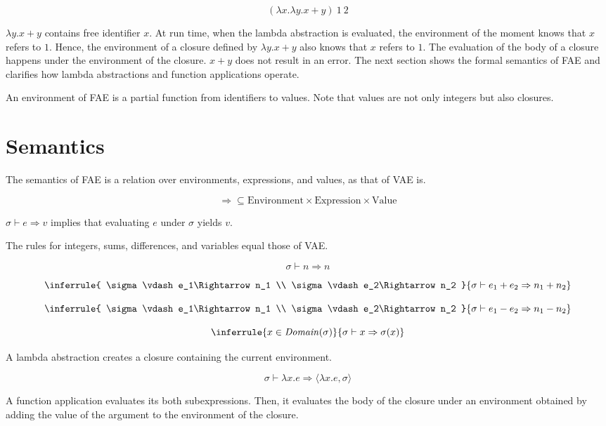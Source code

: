 \[(\lambda x.\lambda y.x + y)\ 1\ 2\]

\(\lambda y.x+y\) contains free identifier \(x\). At run time, when the lambda
abstraction is evaluated, the environment of the moment knows that \(x\) refers
to \(1\). Hence, the environment of a closure defined by \(\lambda y.x+y\) also
knows that \(x\) refers to \(1\). The evaluation of the body of a closure happens
under the environment of the closure. \(x+y\) does not result in an error. The
next section shows the formal semantics of FAE and clarifies how lambda
abstractions and function applications operate.

An environment of FAE is a partial function from identifiers to values. Note that
values are not only integers but also closures.

\section{Semantics}

The semantics of FAE is a relation over environments, expressions, and values, as
that of VAE is.


\[\Rightarrow\subseteq\text{Environment}\times\text{Expression}\times\text{Value}\]

\(\sigma\vdash e\Rightarrow v\) implies that evaluating \(e\) under \(\sigma\)
yields \(v\).

The rules for integers, sums, differences, and variables equal those of VAE.

\[
\sigma\vdash n\Rightarrow n
\]

\[
\inferrule
{ \sigma\vdash e_1\Rightarrow n_1 \\ \sigma\vdash e_2\Rightarrow n_2 }
{ \sigma\vdash e_1+e_2\Rightarrow n_1+n_2 }
\]

\[
\inferrule
{ \sigma\vdash e_1\Rightarrow n_1 \\ \sigma\vdash e_2\Rightarrow n_2 }
{ \sigma\vdash e_1-e_2\Rightarrow n_1-n_2 }
\]

\[
\inferrule
{ x\in\mathit{Domain}(\sigma) }
{ \sigma\vdash x\Rightarrow \sigma(x)}
\]

A lambda abstraction creates a closure containing the current environment.

\[
\sigma\vdash \lambda x.e\Rightarrow \langle\lambda x.e,\sigma\rangle
\]

A function application evaluates its both subexpressions. Then, it evaluates the
body of the closure under an environment obtained by adding the value of the
argument to the environment of the closure.

